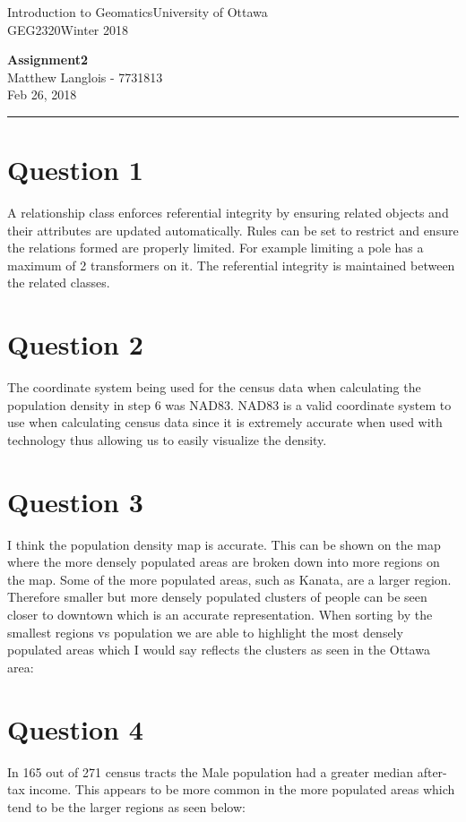 \documentclass[fleqn, 12pt]{article}
\newcommand{\university}{University of Ottawa}
\newcommand{\name}{Matthew Langlois}
\newcommand{\studentNumber}{7731813}
\newcommand{\semester}{Winter 2018}
\newcommand{\assignmentType}{Assignment}
\newcommand{\assignmentNumber}{2}
\newcommand{\dueDate}{Feb 26, 2018}
\newcommand{\courseCode}{GEG2320}
\newcommand{\courseTitle}{Introduction to Geomatics}
\newcommand{\essayTitle}{<Title>} %
\newcommand{\essaySubtitle}{<subtitle>} %
\newcommand{\essayAbstract}{} %
\newcommand{\beginassignemnt}{
    \newlength\tindent
    \setlength{\tindent}{\parindent}
    \setlength{\parindent}{0pt}

    \thispagestyle{assignment}
    \noindent
    \courseTitle \hfill \university\\
    \courseCode \hfill \semester
    \begin{center}
        \textbf{\assignmentType\text{ }\ifdefempty{\assignmentNumber}{}{\#}\assignmentNumber}\\
        \name \hspace{1pt} - \studentNumber\\
        \dueDate\\
    \end{center}
    \vspace{6pt}
    \hrule
    \vspace{1.5\headsep}
}
\newcommand{\beginessay}{
    \nocite{*}

    \pagestyle{frontmatter}
    \pagenumbering{roman}

    \begin{center}
        \normalsize
        \textsc{\university}\\[5cm]
        \LARGE \textbf{\MakeUppercase{\essayTitle}}\\[0.5cm]
        \large \text{ }\essaySubtitle\text{ }\\[10cm] %
        \normalsize
        \textsc{\name}\\
        \textsc{\studentNumber}\\
        \textsc{\courseCode}\\
        \textsc{\semester}\\
        \textsc{\dueDate}
    \end{center}
    \thispagestyle{empty}

    \newpage
    \tableofcontents
    \newpage

    \iftotalfigures
        \addcontentsline{toc}{section}{\listfigurename}
        \listoffigures
    \fi
    \iftotaltables
        \addcontentsline{toc}{section}{\listtablename}
        \listoftables
    \fi

    \ifdefempty{\essayAbstract}{}{
        \newpage
        \addcontentsline{toc}{section}{Abstract}
        \begin{abstract}
            \essayAbstract
        \end{abstract}

    }
    \label{EndFrontMatter}
    \newpage

    \pagenumbering{arabic}
    \pagestyle{body}
}
\begin{document}
\beginassignemnt

\section*{Question 1}

A relationship class enforces referential integrity by ensuring related objects and their attributes are updated automatically. Rules can be set to restrict and ensure the relations formed are properly limited. For example limiting a pole has a maximum of 2 transformers on it. The referential integrity is maintained between the related classes.

\section*{Question 2}

The coordinate system being used for the census data when calculating the population density in step 6 was NAD83. NAD83 is a valid coordinate system to use when calculating census data since it is extremely accurate when used with technology thus allowing us to easily visualize the density.

\section*{Question 3}

I think the population density map is accurate. This can be shown on the map where the more densely populated areas are broken down into more regions on the map. Some of the more populated areas, such as Kanata, are a larger region. Therefore smaller but more densely populated clusters of people can be seen closer to downtown which is an accurate representation. When sorting by the smallest regions vs population we are able to highlight the most densely populated areas which I would say reflects the clusters as seen in the Ottawa area:


\section*{Question 4}

In 165 out of 271 census tracts the Male population had a greater median after-tax income. This appears to be more common in the more populated areas which tend to be the larger regions as seen below:
\end{document}
